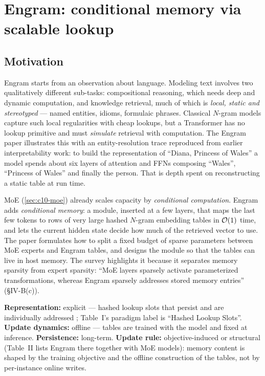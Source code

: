 \section{Engram: conditional memory via scalable lookup}\label{sec:c10-engram}

\subsection{Motivation}

Engram \citep{cheng2026engram} starts from an observation about language. Modeling text involves
two qualitatively different sub-tasks: compositional reasoning, which needs deep and dynamic
computation, and knowledge retrieval, much of which is \emph{local, static and stereotyped} ---
named entities, idioms, formulaic phrases. Classical $N$-gram models capture such local regularities
with cheap lookups, but a Transformer has no lookup primitive and must \emph{simulate} retrieval
with computation. The Engram paper illustrates this with an entity-resolution trace reproduced
from earlier interpretability work: to build the representation of ``Diana, Princess of Wales'' a
model spends about six layers of attention and FFNs composing ``Wales'', ``Princess of Wales'' and
finally the person. That is depth spent on reconstructing a static table at run time.

MoE (\cref{sec:c10-moe}) already scales capacity by \emph{conditional computation}. Engram adds
\emph{conditional memory}: a module, inserted at a few layers, that maps the last few tokens to
rows of very large hashed $N$-gram embedding tables in $\mathcal{O}(1)$ time, and lets the current hidden
state decide how much of the retrieved vector to use. The paper formulates how to split a fixed
budget of sparse parameters between MoE experts and Engram tables, and designs the module so that
the tables can live in host memory. The survey highlights it because it separates memory sparsity
from expert sparsity: ``MoE layers sparsely activate parameterized transformations, whereas Engram
sparsely addresses stored memory entries'' (\S IV-B(c)).

\begin{taxonomy}
\textbf{Representation:} explicit --- hashed lookup slots that persist and are individually
addressed \citep[\S IV-B(c)]{zhoubian2026memory}; Table~I's paradigm label is ``Hashed Lookup Slots''.
\textbf{Update dynamics:} offline --- tables are trained with the model and fixed at inference.
\textbf{Persistence:} long-term.
\textbf{Update rule:} objective-induced or structural (Table~II lists Engram there together with MoE
models): memory content is shaped by the training objective and the offline construction of the
tables, not by per-instance online writes.
\end{taxonomy}

